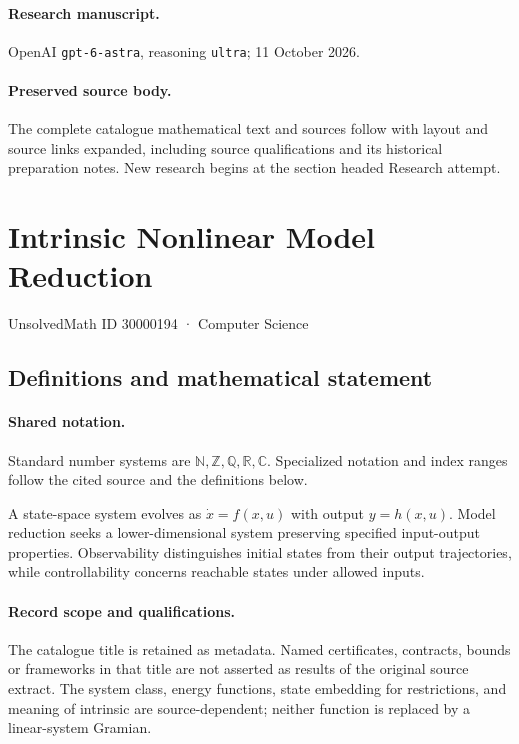 \documentclass[11pt]{article}
\begin{document}
\paragraph{Research manuscript.} OpenAI \texttt{gpt-6-astra}, reasoning \texttt{ultra}; 11 October 2026.
\paragraph{Preserved source body.} The complete catalogue mathematical text and sources follow with layout and source links expanded, including source qualifications and its historical preparation notes. New research begins at the section headed Research attempt.

\section{Intrinsic Nonlinear Model Reduction}\label{30000194}
{\small UnsolvedMath ID 30000194 · Computer Science}
\subsection{Definitions and mathematical statement}

\paragraph{Shared notation.}Standard number systems are $\mathbb N,\mathbb Z,\mathbb Q,\mathbb R,\mathbb C$. Specialized notation and index ranges follow the cited source and the definitions below.


A state-space system evolves as $\dot x=f(x,u)$ with output $y=h(x,u)$. Model reduction seeks a lower-dimensional system preserving specified input-output properties. Observability distinguishes initial states from their output trajectories, while controllability concerns reachable states under allowed inputs.
\paragraph{Record scope and qualifications.}
The catalogue title is retained as metadata. Named certificates, contracts, bounds or frameworks in that title are not asserted as results of the original source extract.
The system class, energy functions, state embedding for restrictions, and meaning of intrinsic are source-dependent; neither function is replaced by a linear-system Gramian.
\end{document}
